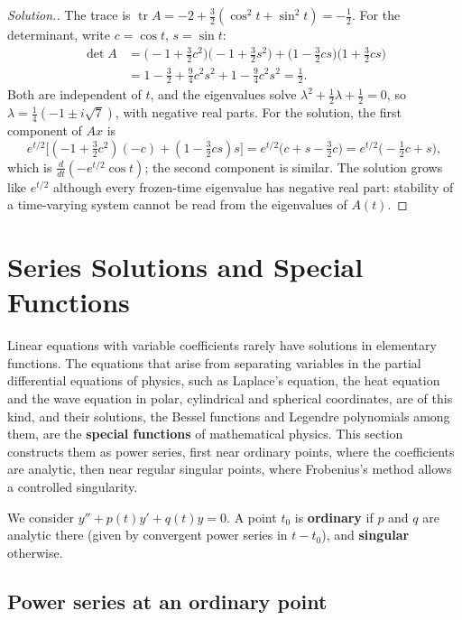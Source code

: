\documentclass[11pt,a4paper]{article}
\numberwithin{equation}{section}
\DeclareMathOperator{\tr}{tr}
\theoremstyle{definition}
\newenvironment{solution}
  {\renewcommand{\qedsymbol}{}\begin{proof}[\textit{Solution}.]}
  {\end{proof}}
\begin{document}
\begin{solution}
The trace is $\tr A = -2 + \frac32(\cos^2t + \sin^2t) = -\frac12$. For the determinant, write $c = \cos t$, $s = \sin t$:
\begin{align*}
\det A &= \bigl(-1 + \tfrac32c^2\bigr)\bigl(-1 + \tfrac32s^2\bigr) + \bigl(1 - \tfrac32cs\bigr)\bigl(1 + \tfrac32cs\bigr)\\
&= 1 - \tfrac32 + \tfrac94c^2s^2 + 1 - \tfrac94c^2s^2 = \tfrac12 .
\end{align*}
Both are independent of $t$, and the eigenvalues solve $\lambda^2 + \frac12\lambda + \frac12 = 0$, so $\lambda = \frac14(-1 \pm i\sqrt7)$, with negative real parts. For the solution, the first
component of $Ax$ is
\[
e^{t/2}\bigl[(-1 + \tfrac32c^2)(-c) + (1 - \tfrac32cs)s\bigr] = e^{t/2}\bigl(c + s - \tfrac32c\bigr) = e^{t/2}\bigl(-\tfrac12c + s\bigr) ,
\]
which is $\frac{d}{dt}(-e^{t/2}\cos t)$; the second component is similar. The solution grows like $e^{t/2}$ although every frozen-time eigenvalue has negative real part: stability of a
time-varying system cannot be read from the eigenvalues of $A(t)$.
\end{solution}

\section{Series Solutions and Special Functions}
\label{sec:series}

Linear equations with variable coefficients rarely have solutions in elementary functions. The equations that arise from separating variables in the
partial differential equations of physics, such as Laplace's equation, the heat equation and the wave equation in polar, cylindrical and spherical
coordinates, are of this kind, and their solutions, the Bessel functions and Legendre polynomials among them, are the \textbf{special functions} of
mathematical physics. This section constructs them as power series, first near ordinary points, where the coefficients are analytic, then near regular
singular points, where Frobenius's method allows a controlled singularity.

We consider $y'' + p(t)y' + q(t)y = 0$. A point $t_0$ is \textbf{ordinary} if $p$ and $q$ are analytic there (given by convergent power series in $t - t_0$), and \textbf{singular} otherwise.

\subsection{Power series at an ordinary point}
\label{ssec:ordinary}
\end{document}
